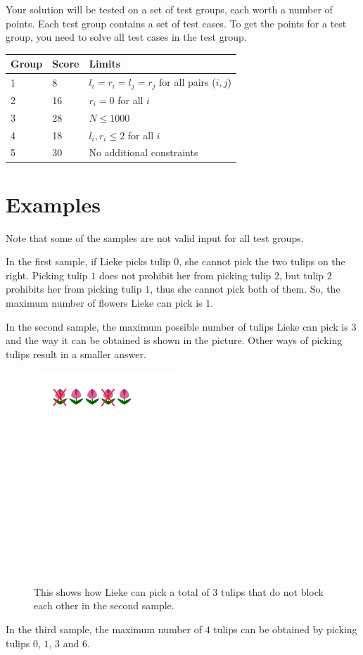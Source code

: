 Your solution will be tested on a set of test groups, each worth a number of points.
Each test group contains a set of test cases. To get the points for a test group, you need to
solve all test cases in the test group.



\begin{tabular}{|l|l|l|}
\hline
Group  &  Score  &  Limits \\
\hline
 1 & 8 & $l_i = r_i = l_j = r_j$ for all pairs ($i, j$)  \\
\hline
 2 & 16 & $r_i = 0$ for all $i$ \\
\hline
 3 & 28 & $N \leq 1000$ \\
\hline
 4 & 18 & $l_i, r_i \leq 2$ for all $i$ \\
\hline
 5 & 30 & No additional constraints \\
\hline
\end{tabular}
\section*{Examples}
Note that some of the samples are not valid input for all test groups.

In the first sample, if Lieke picks tulip $0$, she cannot pick the two tulips on the right. Picking tulip $1$ does not prohibit her from picking tulip $2$, but tulip $2$ prohibits her from picking tulip $1$, thus she cannot pick both of them. So, the maximum number of flowers Lieke can pick is $1$.

In the second sample, the maximum possible number of tulips Lieke can pick is $3$ and the way it can be obtained is shown in the picture. Other ways of picking tulips result in a smaller answer.

\begin{figure}[h]
    \center
    \includegraphics[width=0.5\textwidth]{sample_2_new.pdf}
    \caption{This shows how Lieke can pick a total of $3$ tulips that do not block each other in the second sample.}
  \end{figure}

In the third sample, the maximum number of $4$ tulips can be obtained by picking tulips $0$, $1$, $3$ and $6$.